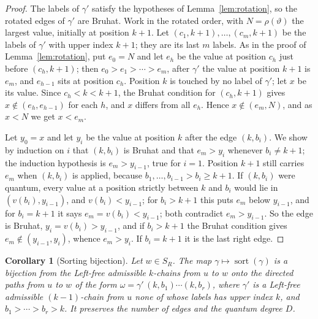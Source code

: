 \documentclass[11pt]{article}
\newtheorem{corollary}[proposition]{Corollary}
\begin{document}
\begin{proof}
The labels of $\gamma'$ satisfy the hypotheses of
Lemma~\ref{lem:rotation}, so the rotated edges of $\gamma'$ are
Bruhat. Work in the rotated order, with $N=\rho(\vartheta)$ the
largest value, initially at position $k+1$. Let
$(c_1,k+1),\ldots,(c_m,k+1)$ be the labels of $\gamma'$ with upper
index $k+1$; they are its last $m$ labels. As in the proof of
Lemma~\ref{lem:rotation}, put $e_0=N$ and let $e_h$ be the value at
position $c_h$ just before $(c_h,k+1)$; then $e_0>e_1>\cdots>e_m$,
after $\gamma'$ the value at position $k+1$ is $e_m$, and $e_{h-1}$
sits at position $c_h$. Position $k$ is touched by no label of
$\gamma'$; let $x$ be its value. Since $c_h<k<k+1$, the Bruhat
condition for $(c_h,k+1)$ gives $x\notin(e_h,e_{h-1})$ for each $h$,
and $x$ differs from all $e_h$. Hence $x\notin(e_m,N)$, and as $x<N$
we get $x<e_m$.

Let $y_0=x$ and let $y_i$ be the value at position $k$ after the edge
$(k,b_i)$. We show by induction on $i$ that $(k,b_i)$ is Bruhat and
that $e_m>y_i$ whenever $b_i\neq k+1$; the induction hypothesis is
$e_m>y_{i-1}$, true for $i=1$. Position $k+1$ still carries $e_m$ when
$(k,b_i)$ is applied, because $b_1,\ldots,b_{i-1}>b_i\geq k+1$. If
$(k,b_i)$ were quantum, every value at a position strictly between
$k$ and $b_i$ would lie in $(v(b_i),y_{i-1})$, and $v(b_i)<y_{i-1}$;
for $b_i>k+1$ this puts $e_m$ below $y_{i-1}$, and for $b_i=k+1$ it
says $e_m=v(b_i)<y_{i-1}$; both contradict $e_m>y_{i-1}$. So the edge
is Bruhat, $y_i=v(b_i)>y_{i-1}$, and if $b_i>k+1$ the Bruhat condition
gives $e_m\notin(y_{i-1},y_i)$, whence $e_m>y_i$. If $b_i=k+1$ it is
the last right edge.
\end{proof}

\begin{corollary}[Sorting bijection]\label{cor:sort-bijection}
Let $w\in S_R$. The map $\gamma\mapsto\operatorname{sort}(\gamma)$ is
a bijection from the Left-free admissible $k$-chains from $u$ to $w$
onto the directed paths from $u$ to $w$ of the form
$\omega=\gamma'\,(k,b_1)\cdots(k,b_r)$, where $\gamma'$ is a Left-free
admissible $(k-1)$-chain from $u$ none of whose labels has upper index
$k$, and $b_1>\cdots>b_r>k$. It preserves the number of edges and the
quantum degree $D$.
\end{corollary}
\end{document}
